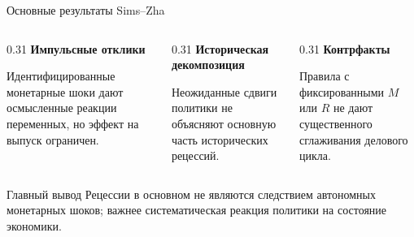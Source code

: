 \begin{frame}[t]{Основные результаты Sims--Zha}
\small

\vspace{0.3em}

\begin{columns}[T,onlytextwidth]

\begin{column}{0.31\textwidth}
\textbf{Импульсные отклики}

\vspace{0.3em}
\footnotesize
Идентифицированные монетарные шоки дают осмысленные реакции переменных, но эффект на выпуск ограничен.
\end{column}

\begin{column}{0.31\textwidth}
\textbf{Историческая декомпозиция}

\vspace{0.3em}
\footnotesize
Неожиданные сдвиги политики не объясняют основную часть исторических рецессий.
\end{column}

\begin{column}{0.31\textwidth}
\textbf{Контрфакты}

\vspace{0.3em}
\footnotesize
Правила с фиксированными $M$ или $R$ не дают существенного сглаживания делового цикла.
\end{column}

\end{columns}

\vspace{1.0em}

\begin{block}{Главный вывод}
\small
Рецессии в основном не являются следствием автономных монетарных шоков; важнее систематическая реакция политики на состояние экономики.
\end{block}

\end{frame}

